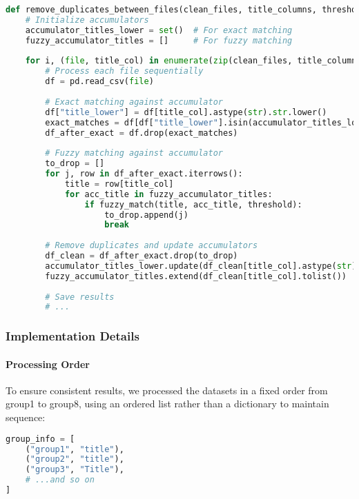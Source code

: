 \documentclass[12pt]{article}
\begin{document}
\begin{lstlisting}[language=Python]
def remove_duplicates_between_files(clean_files, title_columns, threshold=85):
    # Initialize accumulators
    accumulator_titles_lower = set()  # For exact matching
    fuzzy_accumulator_titles = []     # For fuzzy matching
    
    for i, (file, title_col) in enumerate(zip(clean_files, title_columns)):
        # Process each file sequentially
        df = pd.read_csv(file)
        
        # Exact matching against accumulator
        df["title_lower"] = df[title_col].astype(str).str.lower()
        exact_matches = df[df["title_lower"].isin(accumulator_titles_lower)].index
        df_after_exact = df.drop(exact_matches)
        
        # Fuzzy matching against accumulator
        to_drop = []
        for j, row in df_after_exact.iterrows():
            title = row[title_col]
            for acc_title in fuzzy_accumulator_titles:
                if fuzzy_match(title, acc_title, threshold):
                    to_drop.append(j)
                    break
        
        # Remove duplicates and update accumulators
        df_clean = df_after_exact.drop(to_drop)
        accumulator_titles_lower.update(df_clean[title_col].astype(str).str.lower())
        fuzzy_accumulator_titles.extend(df_clean[title_col].tolist())
        
        # Save results
        # ...
\end{lstlisting}

\subsubsection{Implementation Details}\label{implementation-details}

\paragraph{Processing Order}\label{processing-order}

To ensure consistent results, we processed the datasets in a fixed order
from group1 to group8, using an ordered list rather than a dictionary to
maintain sequence:

\begin{lstlisting}[language=Python]
group_info = [
    ("group1", "title"),
    ("group2", "title"),
    ("group3", "Title"),
    # ...and so on
]
\end{lstlisting}
\end{document}
